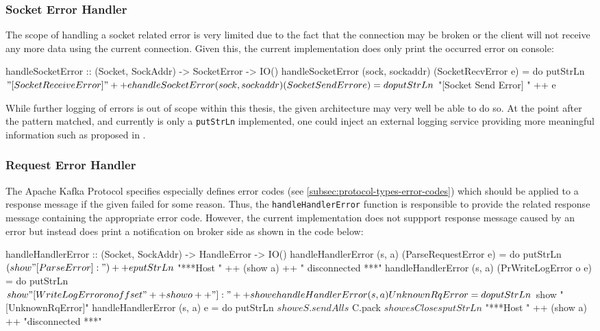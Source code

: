 \subsubsection{Socket Error Handler}

The scope of handling a socket related error is very limited due to the fact
that the connection may be broken or the client will not receive any more data
using the current connection. Given this, the current implementation does only
print the occurred error on console:

\begin{code}
handleSocketError :: (Socket, SockAddr) -> SocketError -> IO()
handleSocketError (sock, sockaddr) (SocketRecvError e) = do
  putStrLn $ "[Socket Receive Error] " ++ e
handleSocketError (sock, sockaddr) (SocketSendError e) = do
  putStrLn $ "[Socket Send Error] " ++ e
\end{code}

While further logging of errors is out of scope within this thesis, the given
architecture may very well be able to do so. At the point after the pattern
matched, and currently is only a \lstinline{putStrLn} implemented, one
could inject an external logging service providing more meaningful information
such as proposed in .

\subsubsection{Request Error Handler}

The Apache Kafka Protocol specifies especially
defines error codes (see \ref{subsec:protocol-types-error-codes}) which should
be applied to a response message if the given failed for some reason. Thus, the
\lstinline{handleHandlerError} function is responsible to provide the related
response message containing the appropriate error code. However, the current
implementation does not suppport response message caused by an error but instead
does print a notification on broker side as shown in the code below:

\begin{code}
handleHandlerError :: (Socket, SockAddr) -> HandleError -> IO()
handleHandlerError (s, a) (ParseRequestError e) = do
    putStrLn $ (show "[ParseError]: ") ++ e
    putStrLn $ "***Host " ++ (show a) ++ " disconnected ***"
handleHandlerError (s, a) (PrWriteLogError o e) = do
    putStrLn $ show "[WriteLogError on offset " ++ show o ++ "]: " ++ show e
handleHandlerError (s, a) UnknownRqError = do
    putStrLn $ show "[UnknownRqError]"
handleHandlerError (s, a) e = do
    putStrLn $ show e
    S.sendAll s $ C.pack $ show e
    sClose s
    putStrLn $ "***Host " ++ (show a) ++ "disconnected ***"
\end{code}


